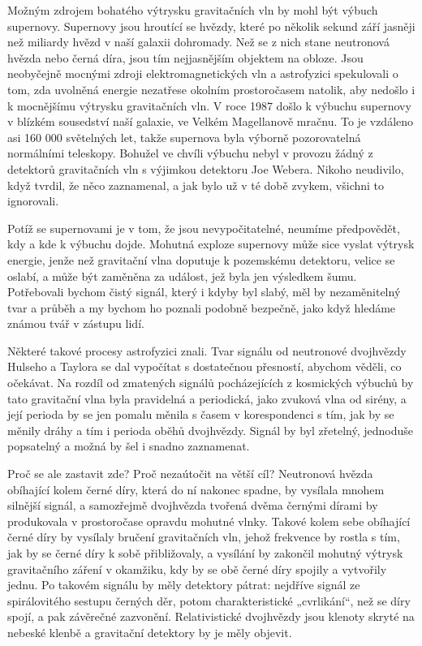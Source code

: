  Možným zdrojem bohatého výtrysku gravitačních vln by mohl být výbuch supernovy. Supernovy jsou
  hroutící se hvězdy, které po několik sekund září jasněji než miliardy hvězd v naší galaxii
  dohromady. Než se z nich stane neutronová hvězda nebo černá díra, jsou tím nejjasnějším objektem
  na obloze. Jsou neobyčejně mocnými zdroji elektromagnetických vln a astrofyzici spekulovali o tom,
  zda uvolněná energie nezatřese okolním prostoročasem natolik, aby nedošlo i k mocnějšímu výtrysku
  gravitačních vln. V roce 1987 došlo k výbuchu supernovy v blízkém sousedství naší galaxie, ve
  Velkém Magellanově mračnu. To je vzdáleno asi 160 000 světelných let, takže supernova byla výborně
  pozorovatelná normálními teleskopy. Bohužel ve chvíli výbuchu nebyl v provozu žádný z detektorů
  gravitačních vln s výjimkou detektoru Joe Webera. Nikoho neudivilo, když tvrdil, že něco
  zaznamenal, a jak bylo už v té době zvykem, všichni to ignorovali. 

  Potíž se supernovami je v tom, že jsou nevypočitatelné, neumíme předpovědět, kdy a kde k výbuchu
  dojde. Mohutná exploze supernovy může sice vyslat výtrysk energie, jenže než gravitační vlna
  doputuje k pozemskému detektoru, velice se oslabí, a může být zaměněna za událost, jež byla jen
  výsledkem šumu. Potřebovali bychom čistý signál, který i kdyby byl slabý, měl by nezaměnitelný
  tvar a průběh a my bychom ho poznali podobně bezpečně, jako když hledáme známou tvář v zástupu
  lidí. 

  Některé takové procesy astrofyzici znali. Tvar signálu od neutronové dvojhvězdy Hulseho a Taylora
  se dal vypočítat s dostatečnou přesností, abychom věděli, co očekávat. Na rozdíl od zmatených
  signálů pocházejících z kosmických výbuchů by tato gravitační vlna byla pravidelná a periodická,
  jako zvuková vlna od sirény, a její perioda by se jen pomalu měnila s časem v korespondenci s tím,
  jak by se měnily dráhy a tím i perioda oběhů dvojhvězdy. Signál by byl zřetelný, jednoduše
  popsatelný a možná by šel i snadno zaznamenat. 

  Proč se ale zastavit zde? Proč nezaútočit na větší cíl? Neutronová hvězda obíhající kolem černé
  díry, která do ní nakonec spadne, by vysílala mnohem silnější signál, a samozřejmě dvojhvězda
  tvořená dvěma černými dírami by produkovala v prostoročase opravdu mohutné vlnky. Takové kolem
  sebe obíhající černé díry by vysílaly bručení gravitačních vln, jehož frekvence by rostla s tím,
  jak by se černé díry k sobě přibližovaly, a vysílání by zakončil mohutný výtrysk gravitačního
  záření v okamžiku, kdy by se obě černé díry spojily a vytvořily jednu. Po takovém signálu by měly
  detektory pátrat: nejdříve signál ze spirálovitého sestupu černých děr, potom charakteristické
  „cvrlikání“, než se díry spojí, a pak závěrečné zazvonění. Relativistické dvojhvězdy jsou klenoty
  skryté na nebeské klenbě a gravitační detektory by je měly objevit.

